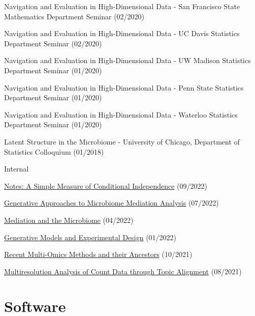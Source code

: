 \documentclass[letterpaper]{article}
\renewenvironment{itemize}{
  \begin{list}{}{
    \setlength{\leftmargin}{1.5em}
  }
}{
  \end{list}
}
\begin{document}
\begin{itemize}
  \item Navigation and Evaluation in High-Dimensional Data - San Francisco State Mathematics Department Seminar (02/2020)
  \item Navigation and Evaluation in High-Dimensional Data - UC Davis Statistics Department Seminar (02/2020)
  \item Navigation and Evaluation in High-Dimensional Data - UW Madison Statistics Department Seminar (01/2020)
  \item Navigation and Evaluation in High-Dimensional Data - Penn State Statistics Department Seminar (01/2020)
  \item Navigation and Evaluation in High-Dimensional Data - Waterloo Statistics Department Seminar (01/2020)
  \item Latent Structure in the Microbiome - University of Chicago, Department of Statistics Colloquium (01/2018)
\end{itemize}

Internal
\begin{itemize}
  \item \href{https://krisrs1128.github.io/talks/2022/20220930/20220930.html}{Notes: A Simple Measure of Conditional Independence} (09/2022)
  \item \href{https://drive.google.com/file/d/1n6gEubzFuIRRRYxGewY81k1ZdQS24oKg/view}{Generative Approaches to Microbiome Mediation Analysis} (07/2022)
  \item \href{https://drive.google.com/file/d/17xNjMA-pH70wM_gknUnM0A5gr0k87gAo/view}{Mediation and the Microbiome} (04/2022)
  \item \href{https://drive.google.com/file/d/1OMIulBki_0an7Lwd0MKPGH1f0OdK0etH/view}{Generative Models and Experimental Design} (01/2022)
  \item \href{https://drive.google.com/file/d/1L2crRIcdbql__XZdJuiRXkAKsvwrIZLO/view}{Recent Multi-Omics Methods and their Ancestors} (10/2021)
  \item \href{https://drive.google.com/file/d/1VcXF0fAK2IlA3yXeqnJ_1CGC6BP4zPqp/view}{Multiresolution Analysis of Count Data through Topic Alignment} (08/2021)
\end{itemize}

\section*{Software}
\end{document}
